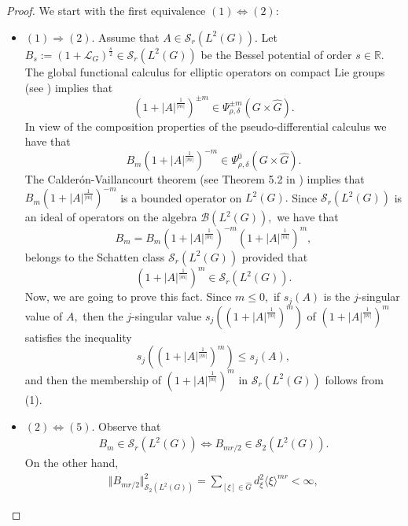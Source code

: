 \documentclass[12pt, reqno]{amsart}
\theoremstyle{definition}
\theoremstyle{remark}
\numberwithin{equation}{section}
\begin{document}
\begin{proof}We start with the first equivalence $(1)\Longleftrightarrow(2):$


    \begin{itemize}
    \item $(1)\Longrightarrow (2).$ Assume that $A\in \mathscr{S}_r(L^2(G)).$  Let  $B_{s}:=(1+\mathcal{L}_G)^{\frac{s}{2}}\in \mathscr{S}_r(L^2(G))$ be the Bessel potential of order $s\in \mathbb{R}.$ The global functional calculus for elliptic operators  on compact Lie groups (see \cite{RuzhanskyWirth2014}) implies that
    \begin{equation}
        (1+|A|^{\frac{1}{|m|}})^{ \pm {m}}\in \Psi^{ \pm m}_{\rho,\delta}(G\times \widehat{G}).
    \end{equation} In view of the composition properties of the pseudo-differential calculus we have that $$  B_{m}(1+|A|^{\frac{1}{|m|}})^{ -m }\in \Psi^{0}_{\rho,\delta}(G\times \widehat{G}).$$ The Calder\'on-Vaillancourt theorem (see Theorem 5.2 in \cite{RuzhanskyWirth2014}) implies that $B_{m}(1+|A|^{\frac{1}{|m|}})^{ -m }$ is a bounded operator on $L^2(G).$ Since $\mathscr{S}_{r}(L^2(G))$ is an ideal of operators on the algebra $\mathscr{B}(L^2(G)),$ we have that
    \begin{equation}
        B_{m}= B_{m}(1+|A|^{\frac{1}{|m|}})^{ -m }(1+|A|^{\frac{1}{|m|}})^{ m },
    \end{equation}belongs to the Schatten class $\mathscr{S}_r(L^2(G))$ provided that $$ (1+|A|^{\frac{1}{|m|}})^{ m }\in \mathscr{S}_r(L^2(G)).$$  Now, we are going to prove this fact. Since $m\leq 0,$ if $s_{j}(A)$ is the $j$-singular value of $A,$ then the $j$-singular value  $s_{j}((1+|A|^{\frac{1}{|m|}})^{ m })$ of $(1+|A|^{\frac{1}{|m|}})^{ m }$ satisfies the inequality
    \begin{equation}
       s_{j}((1+|A|^{\frac{1}{|m|}})^{ m })\leq s_{j}(A),
    \end{equation}and then the membership of $(1+|A|^{\frac{1}{|m|}})^{ m }$ in $\mathscr{S}_r(L^2(G))$ follows from (1).
    \end{itemize}
    \begin{itemize}
        \item $(2)\Longleftrightarrow(5).$ Observe that 
\begin{align*}
    B_{m}\in\mathscr{S}_r(L^2(G))\Longleftrightarrow B_{mr/2}\in\mathscr{S}_2(L^2(G)). 
\end{align*}On the other hand, 
\begin{align*}
    \Vert B_{mr/2}\Vert_{\mathscr{S}_2(L^2(G))}^2=\sum_{[\xi]\in \widehat{G}}d_\xi^2\langle \xi \rangle^{mr}<\infty,

\end{align*}
\end{itemize}
\end{proof}
\end{document}
